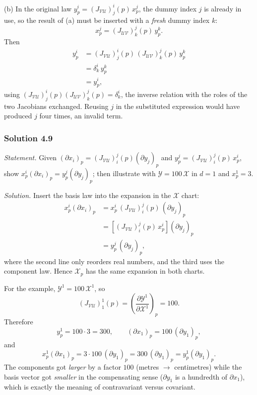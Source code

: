 \documentclass[11pt]{article}
\begin{document}
(b) In the original law $y^i_p=(J_{\mathcal{VU}})^i_j(p)\,x^j_p$, the
dummy index $j$ is already in use, so the result of (a) must be inserted
with a \emph{fresh} dummy index $k$:
\[
x^j_p=(J_{\mathcal{UV}})^j_k(p)\,y^k_p.
\]
Then
\begin{align*}
y^i_p&=(J_{\mathcal{VU}})^i_j(p)\,(J_{\mathcal{UV}})^j_k(p)\,y^k_p\\
&=\delta^i_k\,y^k_p\\
&=y^i_p,
\end{align*}
using $(J_{\mathcal{VU}})^i_j(p)(J_{\mathcal{UV}})^j_k(p)=\delta^i_k$, the
inverse relation with the roles of the two Jacobians exchanged. Reusing $j$
in the substituted expression would have produced $j$ four times, an
invalid term.

\subsubsection*{Solution 4.9}

\noindent\textit{Statement.} Given
$(\partial x_i)_p=(J_{\mathcal{VU}})^j_i(p)(\partial y_j)_p$ and
$y^j_p=(J_{\mathcal{VU}})^j_i(p)\,x^i_p$, show $x^i_p(\partial x_i)_p=
y^j_p(\partial y_j)_p$; then illustrate with $\mathcal Y=100\,\mathcal X$
in $d=1$ and $x^1_p=3$.

\medskip
\noindent\textit{Solution.} Insert the basis law into the expansion in the
$\mathcal X$ chart:
\begin{align*}
x^i_p(\partial x_i)_p
&=x^i_p\,(J_{\mathcal{VU}})^j_i(p)\,(\partial y_j)_p\\
&=\left[(J_{\mathcal{VU}})^j_i(p)\,x^i_p\right](\partial y_j)_p\\
&=y^j_p\,(\partial y_j)_p,
\end{align*}
where the second line only reorders real numbers, and the third uses the
component law. Hence $\mathcal X_p$ has the same expansion in both charts.

For the example, $\mathcal Y^1=100\,\mathcal X^1$, so
\[
(J_{\mathcal{VU}})^1_1(p)=\left(\frac{\partial\mathcal Y^1}{\partial
\mathcal X^1}\right)_p=100.
\]
Therefore
\[
y^1_p=100\cdot3=300,\qquad (\partial x_1)_p=100\,(\partial y_1)_p,
\]
and
\[
x^1_p(\partial x_1)_p=3\cdot100\,(\partial y_1)_p=300\,(\partial y_1)_p=
y^1_p(\partial y_1)_p.
\]
The components got \emph{larger} by a factor $100$ (metres $\to$
centimetres) while the basis vector got \emph{smaller} in the compensating
sense ($\partial y_1$ is a hundredth of $\partial x_1$), which is exactly
the meaning of contravariant versus covariant.
\end{document}
